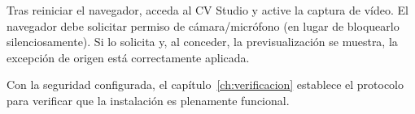 \begin{VerificacionOK}
Tras reiniciar el navegador, acceda al CV Studio y active la captura de vídeo. El navegador
debe solicitar permiso de cámara/micrófono (en lugar de bloquearlo silenciosamente). Si lo
solicita y, al conceder, la previsualización se muestra, la excepción de origen está
correctamente aplicada.
\end{VerificacionOK}

\par\vspace{0.2cm}
Con la seguridad configurada, el capítulo~\ref{ch:verificacion} establece el protocolo para
verificar que la instalación es plenamente funcional.\par
